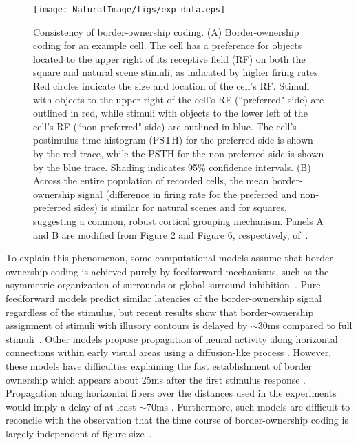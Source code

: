 \begin{figure}[t!]
\centering
\texttt{[image: NaturalImage/figs/exp\_data.eps]}
\makeatletter
\let\@currsize\normalsize
\caption[Consistency of border-ownership coding across square and natural scene stimuli]{Consistency of border-ownership coding. (A) Border-ownership coding for an example cell. The cell has a preference for objects located to the upper right of its receptive field (RF) on both the square and natural scene stimuli, as indicated by higher firing rates. Red circles indicate the size and location of the cell's RF. Stimuli with objects to the upper right of the cell's RF (``preferred" side) are outlined in red, while stimuli with objects to the lower left of the cell's RF (``non-preferred" side) are outlined in blue. The cell's postimulus time histogram (PSTH) for the preferred side is shown by the red trace, while the PSTH for the non-preferred side is shown by the blue trace. Shading indicates 95\% confidence intervals. (B) Across the entire population of recorded cells, the mean border-ownership signal (difference in firing rate for the preferred and non-preferred sides) is similar for natural scenes and for squares, suggesting a common, robust cortical grouping mechanism. Panels A and B are modified from Figure 2 and Figure 6, respectively, of~\citet{Williford_vonderHeydt16}.}
\label{Fig:experiments}
\end{figure}

To explain this phenomenon, some computational models assume that
border-ownership coding is achieved purely by feedforward mechanisms, such as the asymmetric organization of surrounds \citep{Nishimura_Sakai04,Nishimura_Sakai05,Sakai_etal12} or global surround inhibition~\citep{Super_etal10}. Pure feedforward models predict similar latencies of the border-ownership signal regardless of the stimulus, but recent results show that border-ownership assignment of stimuli with illusory contours is delayed by $\sim30$ms compared to full stimuli~\citep{Hesse_Tsao16}. Other models propose  propagation of neural activity along horizontal connections within early visual
areas using a diffusion-like process \citep{Grossberg94,Sajda_Finkel95,
Baek_Sajda05, Kikuchi_Akashi01, Pao_etal99,Zhaoping05,Zucker12}. However, these models have difficulties explaining the fast establishment of border ownership which appears about 25ms after
the first stimulus response \citep{Zhou_etal00}.  Propagation along horizontal fibers over the distances used in the experiments would imply a delay of at least $\sim70$ms \citep[][based on the conduction velocity of horizontal fibers in primate V1 cortex; we are not aware of corresponding data for V2]{Girard_etal01}. Furthermore, such models are difficult to reconcile with the observation that the time course of border-ownership coding is largely independent of figure
size~\citep{Sugihara_etal11}.

